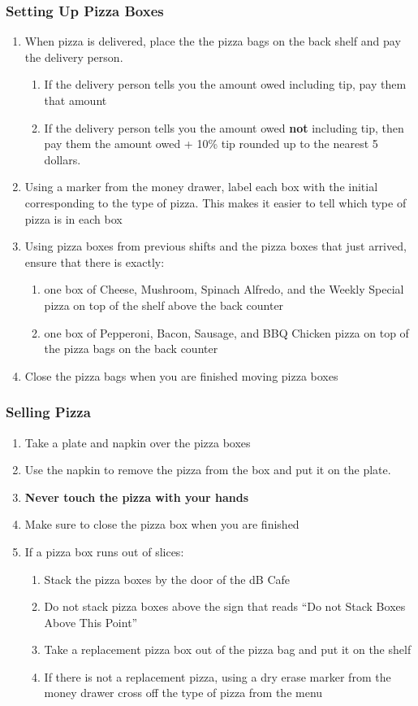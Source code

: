 \documentclass[12pt,onecolumn,letterpaper]{article}
\begin{document}
\subsubsection{Setting Up Pizza Boxes}
\begin{enumerate}
\item When pizza is delivered, place the the pizza bags on the back shelf and pay the delivery person. 
	\begin{enumerate}
	\item If the delivery person tells you the amount owed including tip, pay them that amount
	\item If the delivery person tells you the amount owed \textbf{not} including tip, then pay them the amount owed + 10\% tip rounded up to the nearest 5 dollars.
	\end{enumerate}
\item Using a marker from the money drawer, label each box with the initial corresponding to the type of pizza. This makes it easier to tell which type of pizza is in each box
\item Using pizza boxes from previous shifts and the pizza boxes that just arrived, ensure that there is exactly:
	\begin{enumerate}
	\item one box of Cheese, Mushroom, Spinach Alfredo, and the Weekly Special pizza on top of the shelf above the back counter
	\item one box of Pepperoni, Bacon, Sausage, and BBQ Chicken pizza on top of the pizza bags on the back counter
	\end{enumerate}
\item Close the pizza bags when you are finished moving pizza boxes
\end{enumerate}
\subsubsection{Selling Pizza}
\begin{enumerate}
\item Take a plate and napkin over the pizza boxes
\item Use the napkin to remove the pizza from the box and put it on the plate.
\item \textbf{Never touch the pizza with your hands}
\item Make sure to close the pizza box when you are finished
\item If a pizza box runs out of slices:
	\begin{enumerate}
	\item Stack the pizza boxes by the door of the dB Cafe
	\item Do not stack pizza boxes above the sign that reads ``Do not Stack Boxes Above This Point''
	\item Take a replacement pizza box out of the pizza bag and put it on the shelf
	\item If there is not a replacement pizza, using a dry erase marker from the money drawer cross off the type of pizza from the menu
	\end{enumerate}
\end{enumerate}
\end{document}
